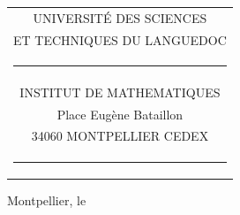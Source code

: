 \begin{tabular}{c}
UNIVERSITÉ DES SCIENCES\\
ET TECHNIQUES DU LANGUEDOC\\
\rule{1cm}{.3pt}\\
INSTITUT DE MATHEMATIQUES\\
Place Eugène Bataillon\\
34060 MONTPELLIER CEDEX\\
\rule{1cm}{.3pt}
\end{tabular}

Montpellier, le
